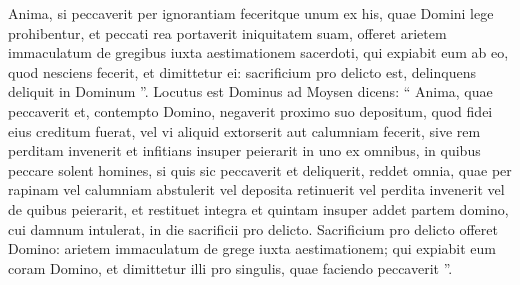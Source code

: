 \begin{biblechapter}
\begin{biblechapter}
\begin{biblechapter}
\begin{biblechapter}
\begin{biblechapter}
 \verse Anima, si peccaverit per ignorantiam feceritque unum ex his, quae Domini lege prohibentur, et peccati rea portaverit iniquitatem suam, 
\verse offeret arietem immaculatum de gregibus iuxta aestimationem sacerdoti, qui expiabit eum ab eo, quod nesciens fecerit, et dimittetur ei: 
\verse sacrificium pro delicto est, delinquens deliquit in Dominum ”.
 \verse Locutus est Dominus ad Moysen dicens: 
\verse “ Anima, quae peccaverit et, contempto Domino, negaverit proximo suo depositum, quod fidei eius creditum fuerat, vel vi aliquid extorserit aut calumniam fecerit, 
\verse sive rem perditam invenerit et infitians insuper peierarit in uno ex omnibus, in quibus peccare solent homines, 
\verse si quis sic peccaverit et deliquerit, reddet omnia, quae per rapinam vel calumniam abstulerit vel deposita retinuerit vel perdita invenerit 
\verse vel de quibus peierarit, et restituet integra et quintam insuper addet partem domino, cui damnum intulerat, in die sacrificii pro delicto. 
\verse Sacrificium pro delicto offeret Domino: arietem immaculatum de grege iuxta aestimationem; 
\verse qui expiabit eum coram Domino, et dimittetur illi pro singulis, quae faciendo peccaverit ”.
 

\end{biblechapter}
\end{biblechapter}
\end{biblechapter}
\end{biblechapter}
\end{biblechapter}
